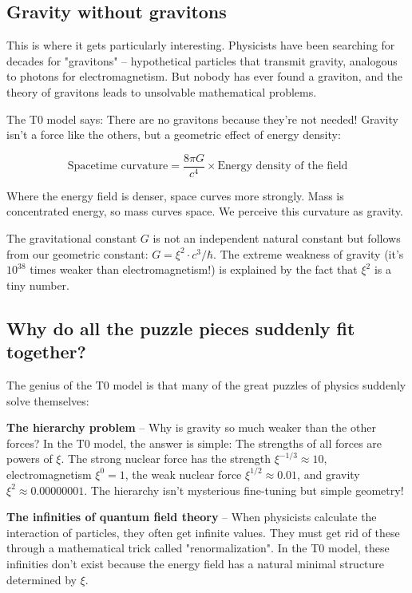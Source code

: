 \documentclass[12pt,a4paper]{article}
\newcommand{\xipar}{\ensuremath{\xi}}
\begin{document}
	\subsection{Gravity without gravitons}
	
	This is where it gets particularly interesting. Physicists have been searching for decades for "gravitons" -- hypothetical particles that transmit gravity, analogous to photons for electromagnetism. But nobody has ever found a graviton, and the theory of gravitons leads to unsolvable mathematical problems.
	
	\begin{revolutionary}
		The T0 model says: There are no gravitons because they're not needed! Gravity isn't a force like the others, but a geometric effect of energy density:
		
		\begin{equation}
			\text{Spacetime curvature} = \frac{8\pi G}{c^4} \times \text{Energy density of the field}
		\end{equation}
		
		Where the energy field is denser, space curves more strongly. Mass is concentrated energy, so mass curves space. We perceive this curvature as gravity.
	\end{revolutionary}
	
	The gravitational constant $G$ is not an independent natural constant but follows from our geometric constant: $G = \xipar^2 \cdot c^3/\hbar$. The extreme weakness of gravity (it's $10^{38}$ times weaker than electromagnetism!) is explained by the fact that $\xipar^2$ is a tiny number.
	
	\subsection{Why do all the puzzle pieces suddenly fit together?}
	
	The genius of the T0 model is that many of the great puzzles of physics suddenly solve themselves:
	
	\textbf{The hierarchy problem} -- Why is gravity so much weaker than the other forces? In the T0 model, the answer is simple: The strengths of all forces are powers of $\xipar$. The strong nuclear force has the strength $\xipar^{-1/3} \approx 10$, electromagnetism $\xipar^0 = 1$, the weak nuclear force $\xipar^{1/2} \approx 0.01$, and gravity $\xipar^2 \approx 0.00000001$. The hierarchy isn't mysterious fine-tuning but simple geometry!
	
	\textbf{The infinities of quantum field theory} -- When physicists calculate the interaction of particles, they often get infinite values. They must get rid of these through a mathematical trick called "renormalization". In the T0 model, these infinities don't exist because the energy field has a natural minimal structure determined by $\xipar$.
	
\end{document}
